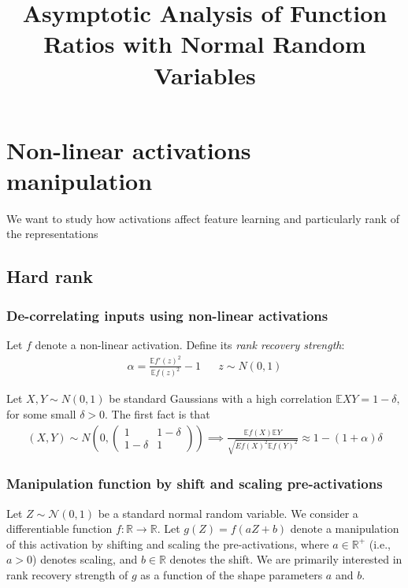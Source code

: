 \documentclass[11pt]{article}
\title{Asymptotic Analysis of Function Ratios with Normal Random Variables}
\author{}
\date{}
\newcommand{\E}{\mathbb{E}}
\begin{document}
\maketitle

\section{Non-linear activations manipulation }
We want to study how activations affect feature learning and particularly rank of the representations 

\subsection{Hard rank}

\subsubsection{De-correlating inputs using non-linear activations}
Let $f$ denote a non-linear activation. Define its \emph{rank recovery strength}:
\begin{align*}
    \alpha = \frac{\E f'(z)^2}{\E f(z)^2 } - 1 && z \sim N(0,1)
\end{align*}

Let $X,Y \sim N(0,1)$ be standard Gaussians with a high correlation  $\E X Y = 1-\delta, $ for some small $\delta > 0.$ The first fact is that 
\begin{align*}
   (X,Y)\sim N\left(0,\begin{pmatrix}
       1 & 1-\delta \\ 1-\delta & 1
   \end{pmatrix} \right) \implies  \frac{\E f(X) \E Y }{\sqrt{E f(X)^2 \E f(Y)^2 }}\approx 1 - (1+\alpha)\delta 
\end{align*}

\subsubsection{Manipulation function by shift and scaling pre-activations}

Let $Z \sim \mathcal{N}(0,1)$ be a standard normal random variable. We consider a differentiable function $f: \mathbb{R} \to \mathbb{R}$. Let $g(Z) = f(aZ+b)$ denote a manipulation of this activation by shifting and scaling the pre-activations,  where $a \in \mathbb{R}^+$ (i.e., $a>0$) denotes scaling, and $b \in \mathbb{R}$ denotes the shift. We are primarily interested in rank recovery strength of $g$ as a function of the shape parameters $a$ and $b.$ 
\end{document}
